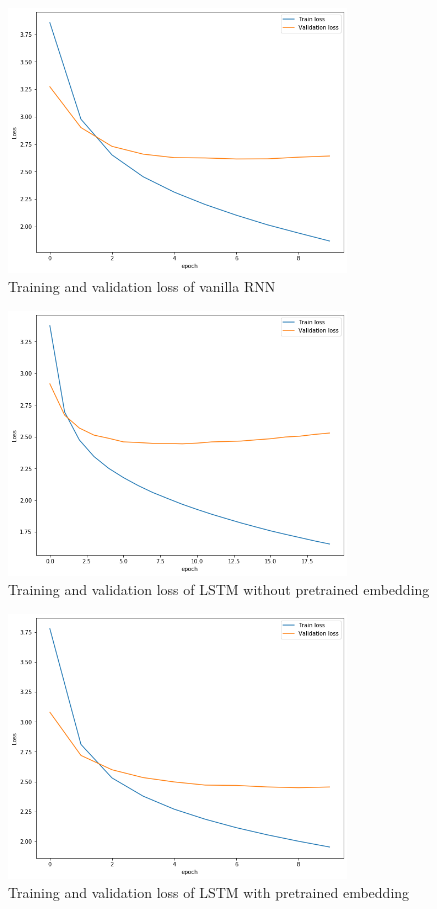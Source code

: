 \documentclass{article} %
\begin{document}
\begin{figure}[htb!]
    \centering
     \includegraphics[width=0.8\textwidth]{RNNloss}
    \caption{Training and validation loss of vanilla RNN}
    \label{RNNloss}
\end{figure}

\begin{figure}[htb!]
    \centering
     \includegraphics[width=0.8\textwidth]{lstm_no_pretrain_loss.png}
    \caption{Training and validation loss of LSTM without pretrained embedding}
    \label{loss_lstm_no}
\end{figure}

\begin{figure}[htb!]
    \centering
     \includegraphics[width=0.8\textwidth]{LSTM_pretrainedloss}
    \caption{Training and validation loss of LSTM with pretrained embedding}
    \label{LSTM_pre_loss}
\end{figure}
\end{document}
